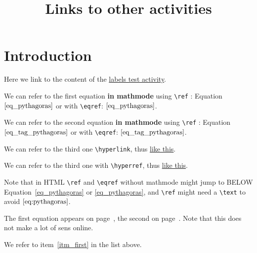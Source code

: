 \documentclass{ximera}
\title{Links to other activities}
\begin{document}
\begin{abstract}
\end{abstract}
\maketitle
\label{xim_labelsFromOtherActivity}



\section{Introduction}
\label{sec:intro} %
 
Here we link to the content of the \hyperlink{xim:labels}{labels test activity}.


We can refer to the first equation \textbf{in mathmode} using \verb|\ref| : Equation~$\ref{eq_pythagoras}$ or with \verb|\eqref|: $\eqref{eq_pythagoras}$.

We can refer to the second equation \textbf{in mathmode} using \verb|\ref| : Equation~$\text{\ref{eq_tag_pythagoras}}$ or with \verb|\eqref|: $\eqref{eq_tag_pythagoras}$.

We can refer to the third one  \verb|\hyperlink|, thus \hyperlink{ht_pythagoras}{like this}.

We can refer to the third one with \verb|\hyperref|, thus \hyperref[ht_pythagoras]{like this}.

Note that in HTML \verb|\ref| and \verb|\eqref| without mathmode might jump to BELOW Equation~\ref{eq_pythagoras} or \eqref{eq_pythagoras}, and
\verb|\ref| might need a \verb|\text| to avoid $\ref{eq:pythagoras}$.

The first equation appears on page~\pageref{eq:pythagoras}, the second on page~\pageref{eq:tag:pythagoras}. 
Note that this does not make a lot of sens online.

We refer to item~\ref{itm_first} in the list above.

\
\end{document}
